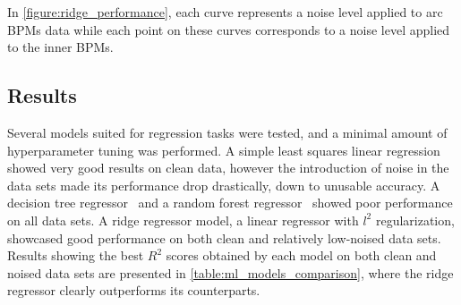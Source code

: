 


In \cref{figure:ridge_performance}, each curve represents a noise level applied to arc BPMs data while each point on these curves corresponds to a noise level applied to the inner BPMs.

\subsection{Results}

Several models suited for regression tasks were tested, and a minimal amount of hyperparameter tuning was performed.
A simple least squares linear regression~\cite{PNAS:Lai:Strong_Consistency_Least_Squares_Estimates_Regression_Models} showed very good results on clean data, however the introduction of noise in the data sets made its performance drop drastically, down to unusable accuracy.
A decision tree regressor~\cite{BOOK:Breiman:Classification_Regression_Trees} and a random forest regressor~\cite{ML:Breiman:Random_Forests} showed poor performance on all data sets.
A ridge regressor model, a linear regressor with \(\mathit{l}^2\) regularization, showcased good performance on both clean and relatively low-noised data sets.
Results showing the best \(R^{2}\) scores obtained by each model on both clean and noised data sets are presented in \cref{table:ml_models_comparison}, where the ridge regressor clearly outperforms its counterparts.

